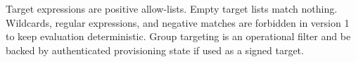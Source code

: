Target expressions are positive allow-lists. Empty target lists match nothing.
Wildcards, regular expressions, and negative matches are forbidden in version 1
to keep evaluation deterministic. Group targeting is an operational filter and
\must be backed by authenticated provisioning state if used as a signed target.

